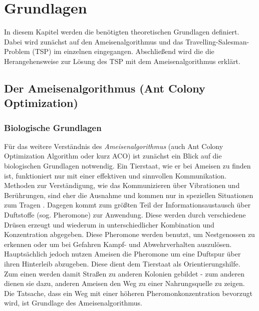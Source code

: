 \documentclass[doktyp=barbeit, sprache=german]{TUBAFarbeiten}
\begin{document}
\section{Grundlagen}
\label{sec:Grundlagen}
In diesem Kapitel werden die benötigten theoretischen Grundlagen definiert. Dabei wird zunächst auf den Ameisenalgorithmus und das Travelling-Salesman-Problem (TSP) im einzelnen eingegangen. Abschließend wird die die Herangehensweise zur Lösung des TSP mit dem Ameisenalgorithmus erklärt.
\subsection{Der Ameisenalgorithmus (Ant Colony Optimization)}
\subsubsection{Biologische Grundlagen}
Für das weitere Verständnis des \textit{Ameisenalgorithmus} (auch Ant Colony Optimization Algorithm oder kurz ACO) ist zunächst ein Blick auf die biologischen Grundlagen notwendig. Ein Tierstaat, wie er bei Ameisen zu finden ist, funktioniert nur mit einer effektiven und sinnvollen Kommunikation. Methoden zur Verständigung, wie das Kommunizieren über Vibrationen und Berührungen, sind eher die Ausnahme und kommen nur in speziellen Situationen zum Tragen \cite{Ameisen}. Dagegen kommt zum größten Teil der Informationsaustausch über Duftstoffe (sog. Pheromone) zur Anwendung. Diese werden durch verschiedene Drüsen erzeugt und wiederum in unterschiedlicher Kombination und Konzentration abgegeben.
Diese Pheromone werden benutzt, um Nestgenossen zu erkennen oder um bei Gefahren Kampf- und Abwehrverhalten auszulösen.
\\Hauptsächlich jedoch nutzen Ameisen die Pheromone um eine Duftspur über ihren Hinterleib abzugeben. Diese dient dem Tierstaat als Orientierungshilfe. Zum einen werden damit Straßen zu anderen Kolonien gebildet - zum anderen dienen sie dazu, anderen Ameisen den Weg zu einer Nahrungsquelle zu zeigen. Die Tatsache, dass ein Weg mit einer höheren Pheromonkonzentration bevorzugt wird, ist Grundlage des Ameisenalgorithmus.
\end{document}
